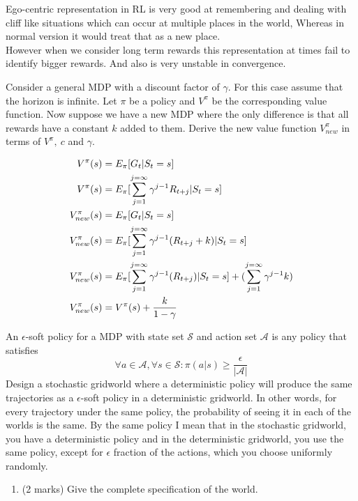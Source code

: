 \documentclass[addpoints,12pt,solution]{exam}
\begin{document}
\begin{questions}
\begin{solution}
Ego-centric representation in RL is very good at remembering and dealing with cliff like situations which can occur at multiple places in the world, Whereas in normal version it would treat that as a new place.\\
However when we consider long term rewards this representation at times fail to identify bigger rewards.
And also is very unstable in convergence.

\end{solution}

\question[2] Consider a general MDP with a discount factor of $\gamma$.
For this case assume that the horizon is infinite. Let $\pi$ be a policy and $V^{\pi}$ be the corresponding value function. Now suppose we have a new
MDP where the only difference is that all rewards have a constant $k$ added to them. Derive the new value function $V^{\pi}_{new}$ in terms of $V^{\pi},\ c$ and $\gamma$.

\begin{solution}
\begin{align}
    V^{\pi}(s) &= E_{\pi}[G_{t}|S_{t} = s]\notag\\
    V^{\pi}(s) &= E_{\pi}[\sum_{j = 1}^{j = \infty} \gamma^{j-1} R_{t+j} | S_{t} = s]\\
    V^{\pi}_{new}(s) &= E_{\pi}[G_{t}|S_{t} = s]\notag\\
    V^{\pi}_{new}(s) &= E_{\pi}[\sum_{j = 1}^{j = \infty} \gamma^{j-1} (R_{t+j} + k) | S_{t} = s]\notag\\
    V^{\pi}_{new}(s) &= E_{\pi}[\sum_{j = 1}^{j = \infty} \gamma^{j-1} (R_{t+j}) | S_{t} = s] + (\sum_{j = 1}^{j = \infty} \gamma^{j-1} k)\notag\\
    V^{\pi}_{new}(s) &= V^{\pi}(s) + \frac {k}{1-\gamma}
\end{align}
\end{solution}


\question[4] An $\epsilon$-soft policy for a MDP with state set $\mathcal{S}$ and action set $\mathcal{A}$ is any policy that satisfies \[\forall a\in \mathcal{A}, \forall s \in \mathcal{S}: \pi(a|s)\geq \frac{\epsilon}{|\mathcal{A}|}\]
Design a stochastic gridworld where a deterministic policy will produce
the same trajectories as a $\epsilon$-soft policy in a deterministic
gridworld. In other words, for every trajectory under the same policy, the
probability of seeing it in each of the worlds is the same. By the same policy I mean
that in the stochastic gridworld, you have a deterministic policy and in the
deterministic gridworld, you use the same policy, except for $\epsilon$ fraction of
the actions, which you choose uniformly randomly. 
\begin{enumerate}[label=(\alph*)]
\item (2 marks) Give the complete specification of the world.



\end{enumerate}
\end{questions}
\end{document}
